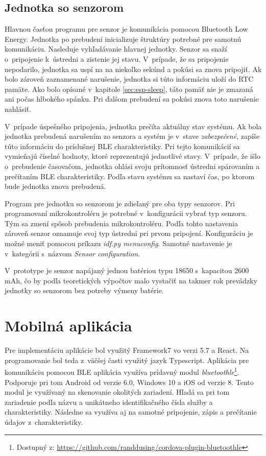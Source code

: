 \subsection{Jednotka so senzorom}

Hlavnou časťou programu pre senzor je komunikácia pomocou Bluetooth Low Energy. Jednotka po prebudení inicializuje štruktúry potrebné pre samotnú komunikáciu. Nasleduje vyhľadávanie hlavnej jednotky. Senzor sa snaží o~pripojenie k~ústredni a zistenie jej stavu. V~prípade, že sa pripojenie nepodarilo, jednotka sa uspí na na niekoľko sekúnd a pokúsi sa znova pripojiť. Ak bolo zároveň zaznamenané narušenie, jednotka si túto informáciu uloží do RTC pamäte. Ako bolo opísané v~kapitole \ref{sec:esp-sleep}, táto pamäť nie je zmazaná ani počas hlbokého spánku. Pri ďalšom prebudení sa pokúsi znova toto narušenie nahlásiť.

V~prípade úspešného pripojenia, jednotka prečíta aktuálny stav systému. Ak bola jednotka prebudená narušením zo senzora a systém je v~stave \textit{zabezpečené}, zapíše túto informáciu do príslušnej BLE charakteristiky. Pri tejto komunikácií sa vymieňajú číselné hodnoty, ktoré reprezentujú jednotlivé stavy. V~prípade, že išlo o~prebudenie časovačom, jednotka ohlási svoju prítomnosť ústredni spárovaním a prečítaním BLE charakteristiky. Podľa stavu systému sa nastaví čas, po ktorom bude jednotka znova prebudená.

Program pre jednotku so senzorom je zdieľaný pre oba typy senzorov. Pri programovaní mikrokontroléru je potrebné v~konfigurácii vybrať typ senzoru. Tým sa zmení spôsob prebudenia mikrokontroléru. Podľa tohto nastavenia zároveň senzor oznamuje svoj typ ústredni pri prvom pripojení. Konfiguráciu je možné meniť pomocou príkazu \textit{idf.py menuconfig}. Samotné nastavenie je v~kategórii s~názvom \textit{Sensor configuration}.

V~prototype je senzor napájaný jednou batériou typu 18650 s~kapacitou 2600 mAh, čo by podľa teoretických výpočtov malo vystačiť na takmer rok prevádzky jednotky so senzorom bez potreby výmeny batérie.

\section{Mobilná aplikácia}

Pre implementáciu aplikácie bol využitý Framework7 vo verzi 5.7 a React. Na programovanie bol teda z~väčšej časti využitý jazyk Typescript. Aplikácia pre komunikáciu pomocou BLE aplikácia využíva prídavný modul \textit{bluetoothle}\footnote{Dostupný z: \url{https://github.com/randdusing/cordova-plugin-bluetoothle}}. Podporuje pri tom Android od verzie 6.0, Windows 10 a iOS od verzie 8. Tento modul je využívaný na skenovanie okolitých zariadení. Hľadá sa pri tom zariadenie podľa názvu a unikátneho identifikačného čísla služby a charakteristiky. Následne sa využíva aj na samotné pripojenie, zápis a prečítanie údajov z~charakteristiky.

